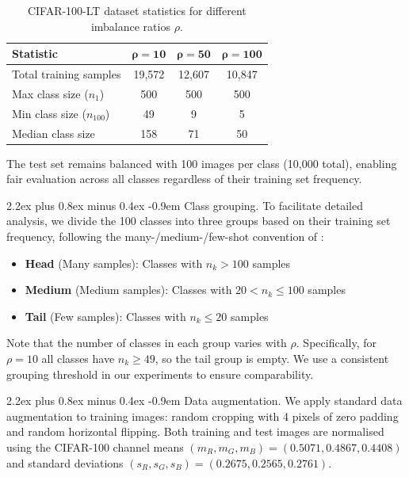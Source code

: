 \documentclass[12pt,a4paper]{article}
\makeatletter
\renewcommand{\paragraph}{\@startsection{paragraph}{4}{\z@}%
  {2.2ex plus 0.8ex minus 0.4ex}%
  {-0.9em}%
  {\normalfont\normalsize\bfseries}}
\makeatother
\begin{document}
\begin{table}[H]
    \centering
    \caption{CIFAR-100-LT dataset statistics for different imbalance ratios $\rho$.}
    \label{tab:dataset_stats}
    \begin{tabular}{lccc}
        \toprule
        \textbf{Statistic} & $\boldsymbol{\rho = 10}$ & $\boldsymbol{\rho = 50}$ & $\boldsymbol{\rho = 100}$ \\
        \midrule
        Total training samples       & 19,572 & 12,607 & 10,847 \\
        Max class size ($n_1$)       & 500    & 500    & 500    \\
        Min class size ($n_{100}$)   & 49     & 9      & 5      \\
        Median class size            & 158    & 71     & 50     \\
        \bottomrule
    \end{tabular}
\end{table}

The test set remains balanced with 100 images per class (10,000 total), enabling fair evaluation across all classes regardless of their training set frequency.

\paragraph{Class grouping.} To facilitate detailed analysis, we divide the 100 classes into three groups based on their training set frequency, following the many-/medium-/few-shot convention of \citet{liu2019large}:

\begin{itemize}
    \item \textbf{Head} (Many samples): Classes with $n_k > 100$ samples
    \item \textbf{Medium} (Medium samples): Classes with $20 < n_k \leq 100$ samples
    \item \textbf{Tail} (Few samples): Classes with $n_k \leq 20$ samples
\end{itemize}
Note that the number of classes in each group varies with $\rho$. Specifically, for $\rho = 10$ all classes have $n_k \geq 49$, so the tail group is empty. We use a consistent grouping threshold in our experiments to ensure comparability.

\paragraph{Data augmentation.} We apply standard data augmentation to training images: random cropping with 4 pixels of zero padding and random horizontal flipping. Both training and test images are normalised using the CIFAR-100 channel means $(m_R, m_G, m_B) = (0.5071, 0.4867, 0.4408)$ and standard deviations $(s_R, s_G, s_B) = (0.2675, 0.2565, 0.2761)$.
\end{document}
